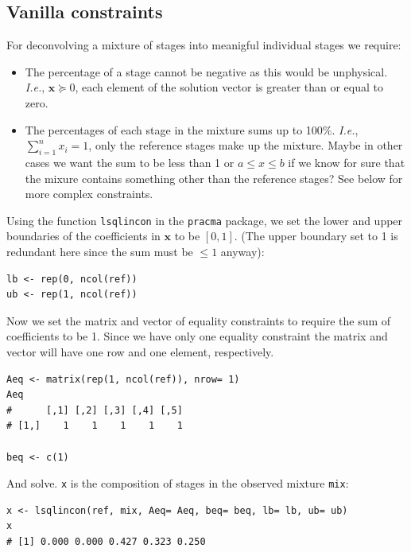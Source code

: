 \documentclass[11pt, fleqn]{article}
\begin{document}
\subsection{Vanilla constraints}

For deconvolving a mixture of stages into meanigful individual stages we require:

\begin{itemize}
    \item The percentage of a stage cannot be negative as this would be
        unphysical. \emph{I.e.}, $\mathbf{x} \succeq 0$, each element of the
        solution vector is greater than or equal to zero.
    \item The percentages of each stage in the mixture sums up to 100\%.
        \emph{I.e.}, $\sum_{i=1}^{n} x_{i} = 1$, only the reference stages make
        up the mixture. Maybe in other cases we want the sum to be less than 1
        or $a \leq x \leq b$ if we know for sure that the mixure contains
        something other than the reference stages? See below for more complex constraints.
\end{itemize}

Using the function \texttt{lsqlincon} in the \texttt{pracma} package, we set
the lower and upper boundaries of the coefficients in $\mathbf{x}$ to be $[0,
1]$. (The upper boundary set to 1 is redundant here since the sum must be $\leq
1$ anyway):

\begin{Verbatim}[formatcom=\color{violet}, fontsize=\small]
lb <- rep(0, ncol(ref))
ub <- rep(1, ncol(ref))
\end{Verbatim}

Now we set the matrix and vector of equality constraints to require the sum of
coefficients to be 1. Since we have only one equality constraint the matrix and
vector will have one row and one element, respectively.

\begin{Verbatim}[formatcom=\color{violet}, fontsize=\small]
Aeq <- matrix(rep(1, ncol(ref)), nrow= 1)
Aeq
#      [,1] [,2] [,3] [,4] [,5]
# [1,]    1    1    1    1    1

beq <- c(1)
\end{Verbatim}

And solve. \texttt{x} is the composition of stages in the observed mixture \texttt{mix}:

\begin{Verbatim}[formatcom=\color{violet}, fontsize=\small]
x <- lsqlincon(ref, mix, Aeq= Aeq, beq= beq, lb= lb, ub= ub)
x
# [1] 0.000 0.000 0.427 0.323 0.250
\end{Verbatim}
\end{document}
